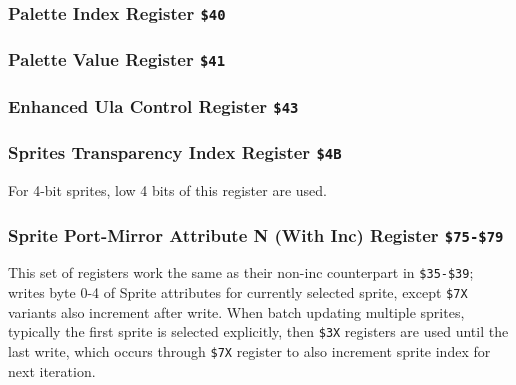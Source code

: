 \pagebreak
\subsubsection{Palette Index Register {\tt \$40}}
\vspace*{-2ex}
\subsubsection{Palette Value Register {\tt \$41}}
\vspace*{-2ex}
\subsubsection{Enhanced Ula Control Register {\tt \$43}}


\subsubsection{Sprites Transparency Index Register {\tt \$4B}}

\begin{NextPort}
\end{NextPort}

For 4-bit sprites, low 4 bits of this register are used.


\subsubsection{Sprite Port-Mirror Attribute N (With Inc) Register {\tt \$75-\$79}}

This set of registers work the same as their non-inc counterpart in {\tt \$35-\$39}; writes byte 0-4 of Sprite attributes for currently selected sprite, except {\tt \$7X} variants also increment  after write. When batch updating multiple sprites, typically the first sprite is selected explicitly, then {\tt \$3X} registers are used until the last write, which occurs through {\tt \$7X} register to also increment sprite index for next iteration.


\pagebreak